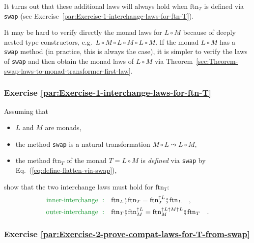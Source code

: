 It turns out that these additional laws will always hold when $\text{ftn}_{T}$
is defined via \lstinline!swap!
(see Exercise~\ref{par:Exercise-1-interchange-laws-for-ftn-T}).

It may be hard to verify directly the monad laws for $L\circ M$ because
of deeply nested type constructors, e.g.~$L\circ M\circ L\circ M\circ L\circ M$.
If the monad $L\circ M$ has a \lstinline!swap!
method (in practice, this is always the case), it is simpler to verify
the laws of \lstinline!swap!
and then obtain the monad laws of $L\circ M$ via Theorem~\ref{sec:Theorem-swap-laws-to-monad-transformer-first-law}.

\subsubsection{Exercise \label{par:Exercise-1-interchange-laws-for-ftn-T}\ref{par:Exercise-1-interchange-laws-for-ftn-T} }

Assuming that
\begin{itemize}
\item $L$ and $M$ are monads,
\item the method \lstinline!swap!
is a natural transformation $M\circ L\leadsto L\circ M$,
\item the method $\text{ftn}_{T}$ of the monad $T=L\circ M$ is \emph{defined}
via \lstinline!swap! by
Eq.~(\ref{eq:define-flatten-via-swap}),
\end{itemize}
show that the two interchange laws must hold for $\text{ftn}_{T}$:
\begin{align*}
{\color{greenunder}\text{inner-interchange }:}\quad & \text{ftn}_{L}\bef\text{ftn}_{T}=\text{ftn}_{T}^{\uparrow L}\bef\text{ftn}_{L}\quad,\\
{\color{greenunder}\text{outer-interchange }:}\quad & \text{ftn}_{T}\bef\text{ftn}_{M}^{\uparrow L}=\text{ftn}_{M}^{\uparrow L\uparrow M\uparrow L}\bef\text{ftn}_{T}\quad.
\end{align*}


\subsubsection{Exercise \label{par:Exercise-2-prove-compat-laws-for-T-from-swap}\ref{par:Exercise-2-prove-compat-laws-for-T-from-swap}}

